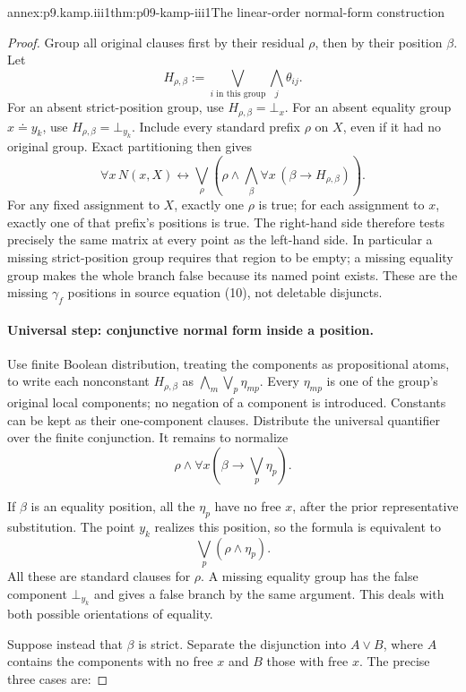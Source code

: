 \begin{annexitem}{annex:p9.kamp.iii1}{thm:p09-kamp-iii1}{The linear-order normal-form construction}
\begin{proof}
Group all original clauses first by their residual \(\rho\), then by
their position \(\beta\).  Let
\[
 H_{\rho,\beta}:=\bigvee_{i\text{ in this group}}
                       \bigwedge_j\theta_{ij}.
\]
For an absent strict-position group, use \(H_{\rho,\beta}=\bot_x\).
For an absent equality group \(x\doteq y_k\), use
\(H_{\rho,\beta}=\bot_{y_k}\).
Include every standard prefix \(\rho\) on \(X\), even if it had no
original group.  Exact partitioning then gives
\[
 \forall x\,N(x,X)\longleftrightarrow
 \bigvee_\rho\left(
   \rho\land\bigwedge_{\beta}
          \forall x\,(\beta\longrightarrow H_{\rho,\beta})
 \right).
\]
For any fixed assignment to \(X\), exactly one \(\rho\) is true;
for each assignment to \(x\), exactly one of that prefix's positions is
true.  The right-hand side therefore tests precisely the same matrix at
every point as the left-hand side.  In particular a missing strict-position
group requires that region to be empty; a missing equality group makes the
whole branch false because its named point exists.  These are the missing
\(\gamma_f\) positions in source equation (10), not deletable disjuncts.

\paragraph{Universal step: conjunctive normal form inside a position.}
Use finite Boolean distribution, treating the components as propositional
atoms, to write each nonconstant \(H_{\rho,\beta}\) as
\(\bigwedge_m\bigvee_p\eta_{mp}\).  Every \(\eta_{mp}\) is one
of the group's original local components; no negation of a component is
introduced.  Constants can be kept as their one-component clauses.
Distribute the universal quantifier over the finite conjunction.  It remains
to normalize
\[
 \rho\land\forall x\left(\beta\longrightarrow
                              \bigvee_p\eta_p\right).
\]

If \(\beta\) is an equality position, all the \(\eta_p\) have no
free \(x\), after the prior representative substitution.  The point
\(y_k\) realizes this position, so the formula is equivalent to
\[
 \bigvee_p(\rho\land\eta_p).
\]
All these are standard clauses for \(\rho\).  A missing equality group
has the false component \(\bot_{y_k}\) and gives a false branch by the
same argument.  This deals with both possible orientations of equality.

Suppose instead that \(\beta\) is strict.  Separate the disjunction into
\(A\lor B\), where \(A\) contains the components with no free \(x\)
and \(B\) those with free \(x\).  The precise three cases are:


\end{proof}
\end{annexitem}

